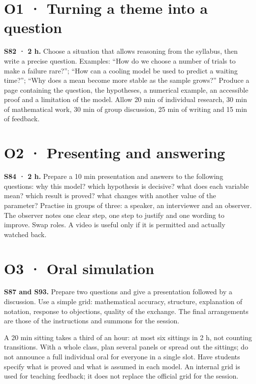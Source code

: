 \section{O1 · Turning a theme into a question}
\textbf{S82 · 2 h.} Choose a situation that allows reasoning from the syllabus, then write a precise question. Examples: ``How do we choose a number of trials to make a failure rare?''; ``How can a cooling model be used to predict a waiting time?''; ``Why does a mean become more stable as the sample grows?''
Produce a page containing the question, the hypotheses, a numerical example, an accessible proof and a limitation of the model. Allow 20 min of individual research, 30 min of mathematical work, 30 min of group discussion, 25 min of writing and 15 min of feedback.
\section{O2 · Presenting and answering}
\textbf{S84 · 2 h.} Prepare a 10 min presentation and answers to the following questions: why this model? which hypothesis is decisive? what does each variable mean? which result is proved? what changes with another value of the parameter?
Practise in groups of three: a speaker, an interviewer and an observer. The observer notes one clear step, one step to justify and one wording to improve. Swap roles. A video is useful only if it is permitted and actually watched back.
\section{O3 · Oral simulation}
\textbf{S87 and S93.} Prepare two questions and give a presentation followed by a discussion. Use a simple grid: mathematical accuracy, structure, explanation of notation, response to objections, quality of the exchange. The final arrangements are those of the instructions and summons for the session.
\ifmxteacher\begin{teachernote}
A 20 min sitting takes a third of an hour: at most six sittings in 2 h, not counting transitions. With a whole class, plan several panels or spread out the sittings; do not announce a full individual oral for everyone in a single slot. Have students specify what is proved and what is assumed in each model. An internal grid is used for teaching feedback; it does not replace the official grid for the session.
\end{teachernote}\fi
